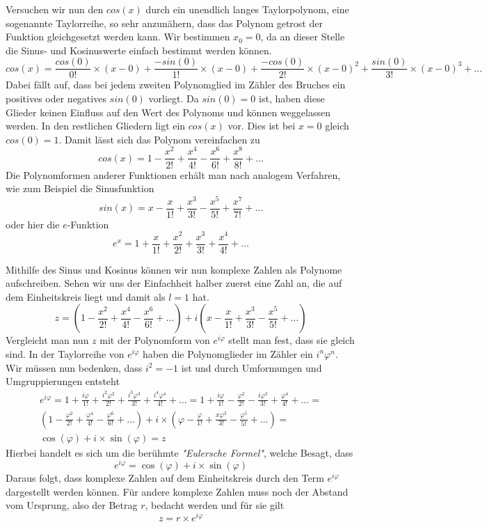 \documentclass[a4paper,12pt]{article} %
\begin{document}
Versuchen wir nun den $cos(x)$ durch ein unendlich langes Taylorpolynom, eine sogenannte Taylorreihe, so sehr anzunähern, dass das Polynom getrost der Funktion gleichgesetzt werden kann.
Wir bestimmen $x_0=0$, da an dieser Stelle die Sinus- und Kosinuswerte einfach bestimmt werden können.
\[cos(x)=\frac{cos(0)}{0!}\times(x-0) + \frac{-sin(0)}{1!}\times(x-0) + \frac{-cos(0)}{2!}\times(x-0)^2+\frac{sin(0)}{3!}\times(x-0)^3+\dots\]
Dabei fällt auf, dass bei jedem zweiten Polynomglied im Zähler des Bruches ein positives oder negatives $sin(0)$ vorliegt.
Da $sin(0)=0$ ist, haben diese Glieder keinen Einfluss auf den Wert des Polynoms und können weggelassen werden. In den restlichen Gliedern ligt ein $cos(x)$ vor. Dies ist bei $x=0$ gleich $cos(0)=1$. Damit lässt sich das Polynom vereinfachen zu
\[cos(x)=1-\frac{x^2}{2!}+\frac{x^4}{4!}-\frac{x^6}{6!}+\frac{x^8}{8!}+\dots\]
Die Polynomformen anderer Funktionen erhält man nach analogem Verfahren, wie zum Beispiel die Sinusfunktion
\[sin(x)=x-\frac{x}{1!}+\frac{x^3}{3!}-\frac{x^5}{5!}+\frac{x^7}{7!}+\dots\]
oder hier die $e$-Funktion
\[e^x=1+\frac{x}{1!}+\frac{x^2}{2!}+\frac{x^3}{3!}+\frac{x^4}{4!}+\dots\]

Mithilfe des Sinus und Kosinus können wir nun komplexe Zahlen als Polynome aufschreiben. Sehen wir uns der Einfachheit halber zuerst eine Zahl an, die auf dem Einheitskreis liegt und damit als $l=1$ hat.
\begin{equation}
	z=%
	\left(1-\frac{x^2}{2!}+\frac{x^4}{4!}-\frac{x^6}{6!}+\dots\right)+i\left(x-\frac{x}{1!}+\frac{x^3}{3!}-\frac{x^5}{5!}+\dots\right)
\end{equation}
Vergleicht man nun $z$ mit der Polynomform von $e^{i\varphi}$ stellt man fest, dass sie gleich sind. 
In der Taylorreihe von $e^{i\varphi}$ haben die Polynomglieder im Zähler ein $i^n\varphi^n$. Wir müssen nun bedenken, dass $i^2=-1$ ist und durch Umformungen und Umgruppierungen entsteht
\begin{multline}	%
	e^{i\varphi}=1+\frac{i\varphi}{1!}+\frac{i^2\varphi^2}{2!}+\frac{i^3\varphi^3}{3!}+\frac{i^4\varphi^4}{4!}+\dots=
	1+\frac{i\varphi}{1!}-\frac{\varphi^2}{2!}-\frac{i\varphi^3}{3!}+\frac{\varphi^4}{4!}+\dots=\\
	\left(1-\frac{\varphi^2}{2!}+\frac{\varphi^4}{4!}-\frac{\varphi^6}{6!}+\dots\right)+i\times\left(\varphi-\frac{\varphi}{1!}+\frac{x\varphi^3}{3!}-\frac{\varphi^5}{5!}+\dots\right) =\\
	\cos(\varphi) + i\times\sin(\varphi)=z
\end{multline}
Hierbei handelt es sich um die berühmte \emph{"{}Eulersche Formel"}, welche Besagt, dass
\begin{equation} \label{euler}
	e^{i\varphi}=\cos(\varphi)+i\times\sin(\varphi)
\end{equation}
Daraus folgt, dass komplexe Zahlen auf dem Einheitskreis durch den Term $e^{i\varphi}$ dargestellt werden können. Für andere komplexe Zahlen muss noch der Abstand vom Ursprung, also der Betrag $r$, bedacht werden und für sie gilt
\[z=r\times e^{i\varphi}\]
\end{document}
